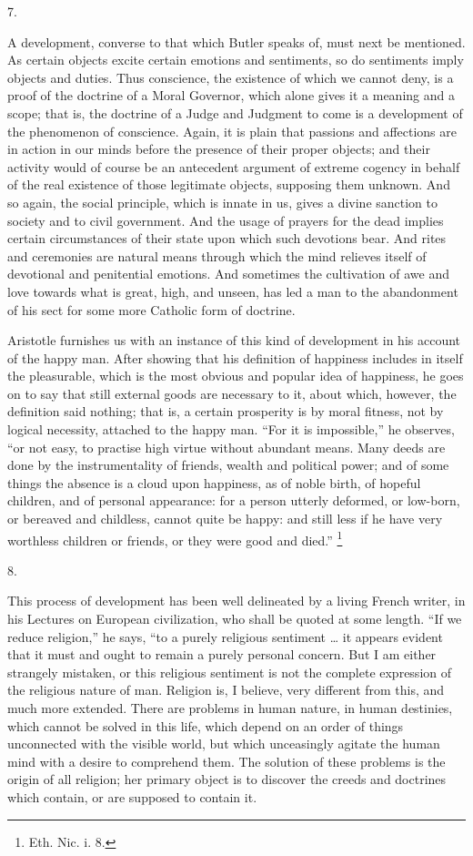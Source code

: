 7.

A development, converse to that which Butler speaks
of, must next be mentioned. As certain objects excite
certain emotions and sentiments, so do sentiments imply
objects and duties. Thus conscience, the existence of
which we cannot deny, is a proof of the doctrine of a
Moral Governor, which alone gives it a meaning and a
scope; that is, the doctrine of a Judge and Judgment to
come is a development of the phenomenon of conscience.
Again, it is plain that passions and affections are in
action in our minds before the presence of their proper
objects; and their activity would of course be an
antecedent argument of extreme cogency in behalf of the
real existence of those legitimate objects, supposing
them unknown. And so again, the social principle, which
is innate in us, gives a divine sanction to society and
to civil government. And the usage of prayers for the
dead implies certain circumstances of their state upon
which such devotions bear. And rites and ceremonies are
natural means through which the mind relieves itself of
devotional and penitential emotions. And sometimes the
cultivation of awe and love towards what is great, high,
and unseen, has led a man to the abandonment of his sect
for some more Catholic form of doctrine.

Aristotle furnishes us with an instance of this kind
of development in his account of the happy man. After
showing that his definition of happiness includes in
itself the pleasurable, which is the most obvious and
popular idea of happiness, he goes on to say that still
external goods are necessary to it, about which, however,
the definition said nothing; that is, a certain
prosperity is by moral fitness, not by logical necessity,
attached to the happy man. ``For it is
impossible,'' he observes, ``or not easy, to
practise high virtue without abundant means. Many deeds
are done by the instrumentality of friends, wealth and
political power; and of some things the absence is a
cloud upon happiness, as of noble birth, of hopeful
children, and of personal appearance: for a person
utterly deformed, or low-born, or bereaved and childless,
cannot quite be happy: and still less if he have very
worthless children or friends, or they were good and
died.'' \footnote{Eth. Nic. i. 8.}

8.

This process of development has been well delineated
by a living French writer, in his Lectures on European
civilization, who shall be quoted at some length.
``If we reduce religion,'' he says, ``to a
purely religious sentiment … it appears evident that
it must and ought to remain a purely personal concern.
But I am either strangely mistaken, or this religious
sentiment is not the complete expression of the religious
nature of man. Religion is, I believe, very different
from this, and much more extended. There are problems in
human nature, in human destinies, which cannot be solved
in this life, which depend on an order of things
unconnected with the visible world, but which unceasingly
agitate the human mind with a desire to comprehend them.
The solution of these problems is the origin of all
religion; her primary object is to discover the creeds
and doctrines which contain, or are supposed to contain
it.


